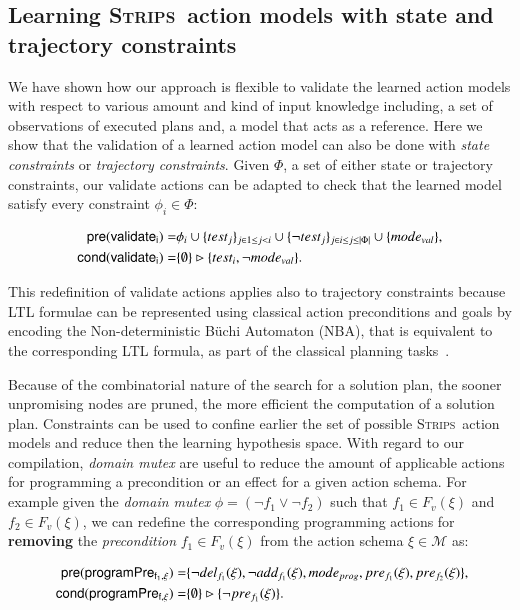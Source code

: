 \documentclass[3p,times]{elsarticle}
\newcommand{\pre}{\mathsf{pre}}  %
\newcommand{\cond}{\mathsf{cond}}   %
\newcommand{\strips}{\textsc{Strips}}     %
\begin{document}
\subsection{Learning \strips\ action models with state and trajectory constraints}
We have shown how our approach is flexible to validate the learned action models with respect to various amount and kind of input knowledge including, a set of observations of executed plans and, a model that acts as a reference. Here we show that the validation of a learned action model can also be done with {\em state constraints} or {\em trajectory constraints}. Given $\Phi$, a set of either state or trajectory constraints, our validate actions can be adapted to check that the learned model satisfy every constraint $\phi_i\in\Phi$:
\begin{small}
\begin{align*}
\hspace*{7pt}\pre(\mathsf{validate_{i}})=&\phi_i\cup\{test_j\}_{j\in 1\leq j<i}\cup\{\neg test_j\}_{j\in i\leq j\leq |\Phi|}\cup \{mode_{val}\},\\
\cond(\mathsf{validate_{i}})=&\{\emptyset\}\rhd\{test_i,\neg mode_{val}\}.
\end{align*}
\end{small}

This redefinition of validate actions applies also to trajectory constraints because LTL formulae can be represented using classical action preconditions and goals by encoding the Non-deterministic B\"{u}chi Automaton (NBA), that is equivalent to the corresponding LTL formula, as part of the classical planning tasks~\cite{baier2006planning}.

Because of the combinatorial nature of the search for a solution plan, the sooner unpromising nodes are pruned, the more efficient the computation of a solution plan. Constraints can be used to confine earlier the set of possible \strips\ action models and reduce then the learning hypothesis space. With regard to our compilation, {\em domain mutex} are useful to reduce the amount of applicable actions for programming a precondition or an effect for a given action schema. For example given the {\em domain mutex} $\phi=(\neg f_1\vee \neg f_2)$ such that $f_1\in F_v(\xi)$ and $f_2\in F_v(\xi)$, we can redefine the corresponding programming actions for {\bf removing} the {\em precondition} $f_1\in F_v(\xi)$ from the action schema $\xi\in\mathcal{M}$ as:

\begin{small}
\begin{align*}
\hspace*{7pt}\pre(\mathsf{programPre_{f_1,\xi}})=&\{\neg del_{f_1}(\xi),\neg add_{f_1}(\xi), mode_{prog}, pre_{f_1}(\xi), pre_{f_2}(\xi)\},\\
\cond(\mathsf{programPre_{f,\xi}})=&\{\emptyset\}\rhd\{\neg pre_{f_1}(\xi)\}.
\end{align*}
\end{small}
\end{document}
